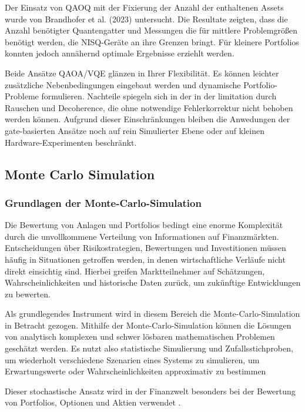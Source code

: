 Der Einsatz von QAOQ mit der Fixierung der Anzahl der enthaltenen Assets wurde von Brandhofer et al. (2023) untersucht. Die Resultate zeigten, dass die Anzahl benötigter Quantengatter und Messungen die für mittlere Problemgrößen benötigt werden, die NISQ-Geräte an ihre Grenzen bringt. Für kleinere Portfolios konnten jedoch annähernd optimale Ergebnisse erziehlt werden. 

Beide Ansätze QAOA/VQE glänzen in Ihrer Flexibilität. Es können leichter zusätzliche Nebenbedingungen eingebaut werden und dynamische Portfolio-Probleme formulieren. Nachteile spiegeln sich in der in der limitation durch Rauschen und Decoherence, die ohne notwendige Fehlerkorrektur nicht behoben werden können. Aufgrund dieser Einschränkungen bleiben die Anwedungen der gate-basierten Ansätze noch auf rein Simulierter Ebene oder auf kleinen Hardware-Experimenten beschränkt. 


\subsection{ Monte Carlo Simulation}

\subsubsection*{Grundlagen der Monte-Carlo-Simulation}
Die Bewertung von Anlagen und Portfolios bedingt eine enorme Komplexität durch die unvollkommene Verteilung von Informationen auf Finanzmärkten. Entscheidungen über Risikostrategien, Bewertungen und Investitionen müssen häufig in Situationen getroffen werden, in denen wirtschaftliche Verläufe nicht direkt einsichtig sind. Hierbei greifen Marktteilnehmer auf Schätzungen, Wahrscheinlichkeiten und historische Daten zurück, um zukünftige Entwicklungen zu bewerten. 
 
Als grundlegendes Instrument wird in diesem Bereich die Monte-Carlo-Simulation in Betracht gezogen. Mithilfe der Monte-Carlo-Simulation können die Lösungen von analytisch komplexen und schwer lösbaren mathematischen Problemen geschätzt werden. Es nutzt also statistische Simulierung und Zufallsstichproben, um wiederholt verschiedene Szenarien eines Systems zu simulieren, um Erwartungswerte oder Wahrscheinlichkeiten approximativ zu bestimmen

Dieser stochastische Ansatz wird in der Finanzwelt besonders bei der Bewertung von Portfolios, Optionen und Aktien verwendet \cite{orus2019}.




